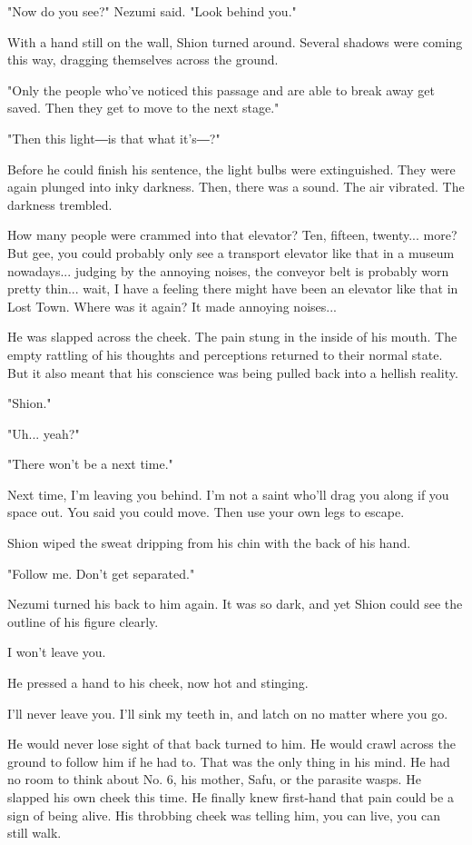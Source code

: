 "Now do you see?" Nezumi said. "Look behind you."

With a hand still on the wall, Shion turned around. Several shadows were
coming this way, dragging themselves across the ground.

"Only the people who've noticed this passage and are able to break away
get saved. Then they get to move to the next stage."

"Then this light―is that what it's―?"

Before he could finish his sentence, the light bulbs were extinguished.
They were again plunged into inky darkness. Then, there was a sound. The
air vibrated. The darkness trembled.

How many people were crammed into that elevator? Ten, fifteen, twenty...
more? But gee, you could probably only see a transport elevator like
that in a museum nowadays... judging by the annoying noises, the
conveyor belt is probably worn pretty thin... wait, I have a feeling
there might have been an elevator like that in Lost Town. Where was it
again? It made annoying noises...

He was slapped across the cheek. The pain stung in the inside of his
mouth. The empty rattling of his thoughts and perceptions returned to
their normal state. But it also meant that his conscience was being
pulled back into a hellish reality.

"Shion."

"Uh... yeah?"

"There won't be a next time."

Next time, I'm leaving you behind. I'm not a saint who'll drag you along
if you space out. You said you could move. Then use your own legs to
escape.

Shion wiped the sweat dripping from his chin with the back of his hand.

"Follow me. Don't get separated."

Nezumi turned his back to him again. It was so dark, and yet Shion could
see the outline of his figure clearly.

I won't leave you.

He pressed a hand to his cheek, now hot and stinging.

I'll never leave you. I'll sink my teeth in, and latch on no matter
where you go.

He would never lose sight of that back turned to him. He would crawl
across the ground to follow him if he had to. That was the only thing in
his mind. He had no room to think about No. 6, his mother, Safu, or the
parasite wasps. He slapped his own cheek this time. He finally knew
first-hand that pain could be a sign of being alive. His throbbing cheek
was telling him, you can live, you can still walk.

